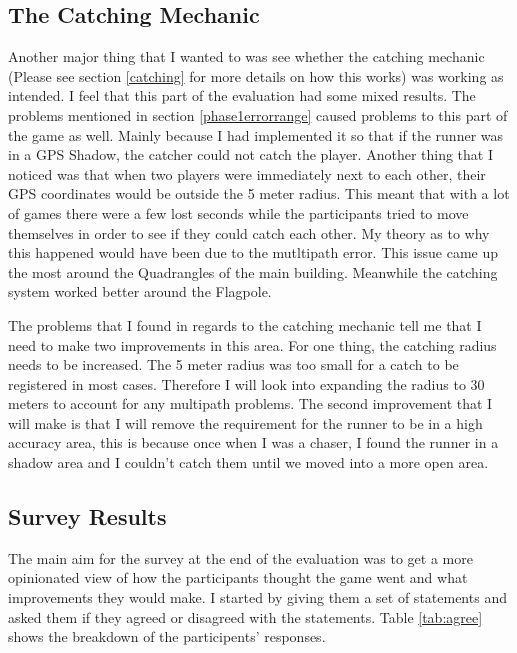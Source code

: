 \documentclass{l4proj}
\begin{document}
\subsection{The Catching Mechanic}
\label{phase1catching}
Another major thing that I wanted to was see whether the catching mechanic (Please see section \ref{catching} for more details on how this works)
was working as intended. I feel that this part of the evaluation had some mixed results. The problems mentioned in section
\ref{phase1errorrange} caused problems to this part of the game as well. Mainly because I had implemented it so that if the
runner was in a GPS Shadow, the catcher could not catch the player. Another thing that I noticed was that when two players
were immediately next to each other, their GPS coordinates would be outside the 5 meter radius. This meant that with a lot of
games there were a few lost seconds while the participants tried to move themselves in order to see if they could catch each other.
My theory as to why this happened would have been due to the mutltipath error. This issue came up the most around the Quadrangles
of the main building. Meanwhile the catching system worked better around the Flagpole.

The problems that I found in regards to the catching mechanic tell me that I need to make two improvements in this area. For one
thing, the catching radius needs to be increased. The 5 meter radius was too small for a catch to be registered in most cases. Therefore
I will look into expanding the radius to 30 meters to account for any multipath problems. The second improvement that I will
make is that I will remove the requirement for the runner to be in a high accuracy area, this is because once when I was a chaser,
I found the runner in a shadow area and I couldn't catch them until we moved into a more open area.


\subsection{Survey Results}
\label{phase1survey}
The main aim for the survey at the end of the evaluation was to get a more opinionated view of how the participants
thought the game went and what improvements they would make. I started by giving them a set of statements and asked
them if they agreed or disagreed with the statements. Table \ref{tab:agree} shows the breakdown of the participents'
responses.
\end{document}
